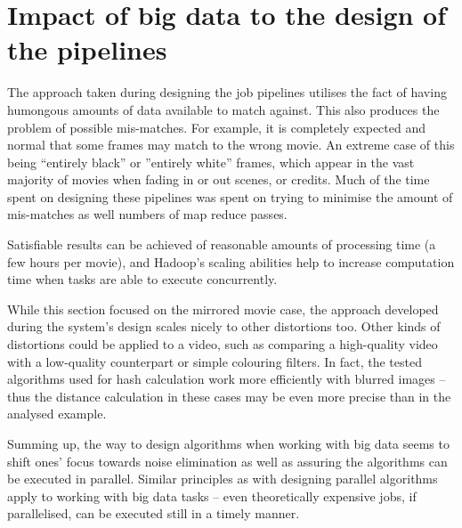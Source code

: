 \section{Impact of big data to the design of the pipelines}
\label{sec:summing-up-analysis}

The approach taken during designing the job pipelines utilises the fact of having humongous amounts of data available to match against. This also produces the problem of possible mis-matches. For example, it is completely expected and normal that some frames may match to the wrong movie. An extreme case of this being ``entirely black'' or ''entirely white'' frames, which appear in the vast majority of movies when fading in or out scenes, or credits. Much of the time spent on designing these pipelines was spent on trying to minimise the amount of mis-matches as well numbers of map reduce passes.

Satisfiable results can be achieved of reasonable amounts of processing time (a few hours per movie), and Hadoop's scaling abilities help to increase computation time when tasks are able to execute concurrently. 

While this section focused on the mirrored movie case, the approach developed during the system's design scales nicely to other distortions too. Other kinds of distortions could be applied to a video, such as comparing a high-quality video with a low-quality counterpart or simple colouring filters. In fact, the tested algorithms used for hash calculation work more efficiently with blurred images -- thus the distance calculation in these cases may be even more precise than in the analysed example.

Summing up, the way to design algorithms when working with big data seems to shift ones' focus towards noise elimination as well as assuring the algorithms can be executed in parallel. Similar principles as with designing parallel algorithms apply to working with big data tasks -- even theoretically expensive jobs, if parallelised, can be executed still in a timely manner.















